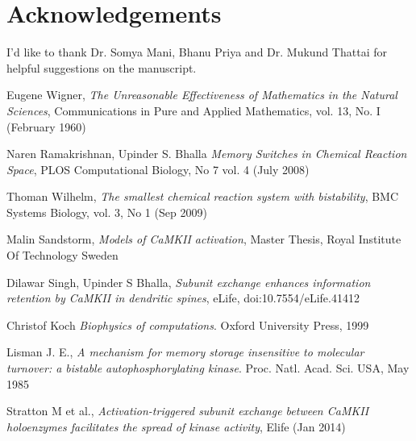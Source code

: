 \documentclass[]{resonance}
\begin{document}
\section*{Acknowledgements} I'd like to thank Dr. Somya Mani, Bhanu Priya and
Dr. Mukund Thattai for helpful suggestions on the manuscript. 

\vspace{3mm}

\begin{thebibliography}{99} 

    Eugene Wigner,
    \textit{The Unreasonable Effectiveness of Mathematics in the Natural Sciences},
     Communications in Pure and Applied Mathematics, vol. 13, No. I (February 1960)

    Naren Ramakrishnan, Upinder S. Bhalla
    \textit{Memory Switches in Chemical Reaction Space},
    PLOS Computational Biology, No 7 vol. 4 (July 2008)

    Thoman Wilhelm,
    \textit{The smallest chemical reaction system with bistability},
    BMC Systems Biology, vol. 3, No 1 (Sep 2009)

    Malin Sandstorm,
    \textit{Models of CaMKII activation},
    Master Thesis, Royal Institute Of Technology Sweden 

    Dilawar Singh, Upinder S Bhalla,
    \textit{Subunit exchange enhances information retention by CaMKII in dendritic spines},
    eLife, doi:10.7554/eLife.41412

    Christof Koch
    \textit{Biophysics of computations}.
    Oxford University Press, 1999

    Lisman J. E., 
    \textit{A mechanism for memory storage insensitive to molecular turnover: a
    bistable autophosphorylating kinase}. 
    Proc. Natl. Acad. Sci. USA, May 1985


    Stratton M et al.,
    \textit{Activation-triggered subunit exchange between CaMKII holoenzymes
    facilitates the spread of kinase activity}, Elife (Jan 2014) 

\end{thebibliography}
\end{document}
